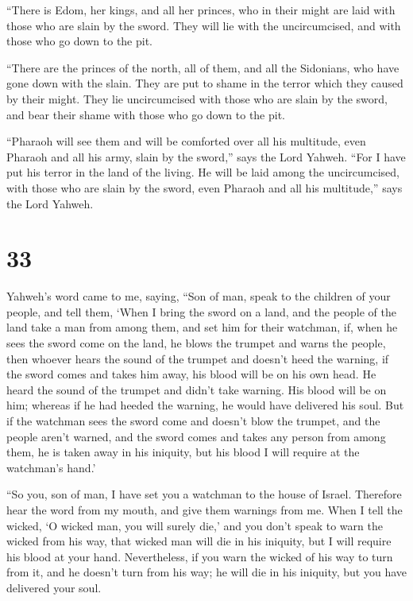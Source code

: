  ``There is Edom, her kings, and all her princes, who in
their might are laid with those who are slain by the sword. They will
lie with the uncircumcised, and with those who go down to the pit.

 ``There are the princes of the north, all of them, and
all the Sidonians, who have gone down with the slain. They are put to
shame in the terror which they caused by their might. They lie
uncircumcised with those who are slain by the sword, and bear their
shame with those who go down to the pit.

 ``Pharaoh will see them and will be comforted over all
his multitude, even Pharaoh and all his army, slain by the sword,'' says
the Lord Yahweh.  ``For I have put his terror in the land
of the living. He will be laid among the uncircumcised, with those who
are slain by the sword, even Pharaoh and all his multitude,'' says the
Lord Yahweh.

\hypertarget{section-31}{%
\section{33}\label{section-31}}

 Yahweh's word came to me, saying,  ``Son of
man, speak to the children of your people, and tell them, `When I bring
the sword on a land, and the people of the land take a man from among
them, and set him for their watchman,  if, when he sees
the sword come on the land, he blows the trumpet and warns the people,
 then whoever hears the sound of the trumpet and doesn't
heed the warning, if the sword comes and takes him away, his blood will
be on his own head.  He heard the sound of the trumpet and
didn't take warning. His blood will be on him; whereas if he had heeded
the warning, he would have delivered his soul.  But if the
watchman sees the sword come and doesn't blow the trumpet, and the
people aren't warned, and the sword comes and takes any person from
among them, he is taken away in his iniquity, but his blood I will
require at the watchman's hand.'

 ``So you, son of man, I have set you a watchman to the
house of Israel. Therefore hear the word from my mouth, and give them
warnings from me.  When I tell the wicked, `O wicked man,
you will surely die,' and you don't speak to warn the wicked from his
way, that wicked man will die in his iniquity, but I will require his
blood at your hand.  Nevertheless, if you warn the wicked
of his way to turn from it, and he doesn't turn from his way; he will
die in his iniquity, but you have delivered your soul.

